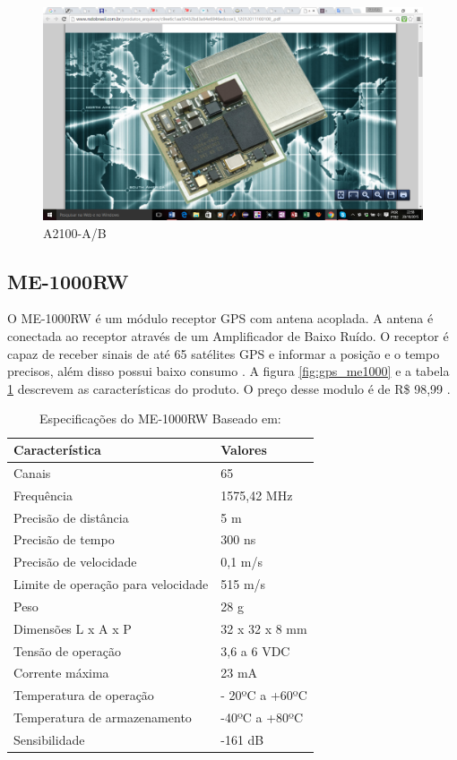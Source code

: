   \begin{figure}[h]
    \centering
    \includegraphics[width=200 px, scale=1]{figuras/a2100}
    \caption{A2100-A/B   \cite{10gps}}
  \label{fig:a2100}
  \end{figure}

  \subsection{ME-1000RW}

  O ME-1000RW é um módulo receptor GPS com antena acoplada. A antena é conectada
  ao receptor através de um Amplificador de Baixo Ruído. O receptor é capaz de
  receber sinais de até 65 satélites GPS e informar a posição e o tempo precisos,
  além disso possui baixo consumo \cite{11gps}. A figura \ref{fig:gps_me1000} e a tabela
  \ref{table:especificacao_gps_me1000}
  descrevem as  características do produto. O preço desse modulo é de R\$ 98,99 \cite{12gps}.


\begin{table}[ht]
\caption{Especificações do ME-1000RW Baseado em: \cite{11gps}}
\centering
\begin{tabular}{| l |  p{5cm} |}
\hline
Característica & Valores \\
\hline
Canais & 65 \\
\hline
Frequência & 1575,42 MHz \\
\hline
Precisão de distância & 5 m \\
\hline
Precisão de tempo & 300 ns \\
\hline
Precisão de velocidade & 0,1 m/s \\
\hline
Limite de operação para velocidade & 515 m/s \\
\hline
Peso & 28 g \\
\hline
Dimensões L x A x P & 32 x 32 x 8 mm \\
\hline
Tensão de operação & 3,6 a 6 VDC \\
\hline
Corrente máxima & 23 mA \\
\hline
Temperatura de operação & - 20ºC a +60ºC \\
\hline
Temperatura de armazenamento & -40ºC a +80ºC \\
\hline
Sensibilidade & -161 dB \\
\hline
\end{tabular}
\label{table:especificacao_gps_me1000}
\end{table}


